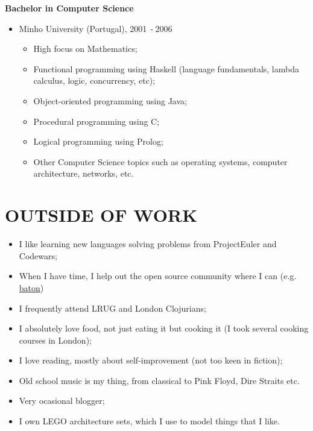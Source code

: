 \documentclass{res}
\def\Minus{\texttt{-}\,}
\begin{document}
\begin{resume}
    {\bf Bachelor in Computer Science}
    \begin{itemize}
      \item[] Minho University (Portugal), 2001 \Minus 2006
      \begin{itemize}
        \item High focus on Mathematics;
        \item Functional programming using Haskell (language fundamentals, lambda calculus, logic, concurrency, etc);
        \item Object-oriented programming using Java;
        \item Procedural programming using C;
        \item Logical programming using Prolog;
        \item Other Computer Science topics such as operating systems, computer architecture, networks, etc.
      \end{itemize}
    \end{itemize}

\section{OUTSIDE OF WORK}
\vspace{0.1in}
\begin{itemize}
  \item I like learning new languages solving problems from ProjectEuler and
  Codewars;
  \item When I have time, I help out the open source community where I can
  (e.g. \href{https://github.com/digital-science/baton}{baton})
  \item I frequently attend LRUG and London Clojurians;
  \item I absolutely love food, not just eating it but cooking it (I took
  several cooking courses in London);
  \item I love reading, mostly about self-improvement (not too keen in fiction);
  \item Old school music is my thing, from classical to Pink Floyd, Dire Straits etc.
  \item Very ocasional blogger;
  \item I own LEGO architecture sets, which I use to model things that I like.
\end{itemize}

\end{resume}
\end{document}
